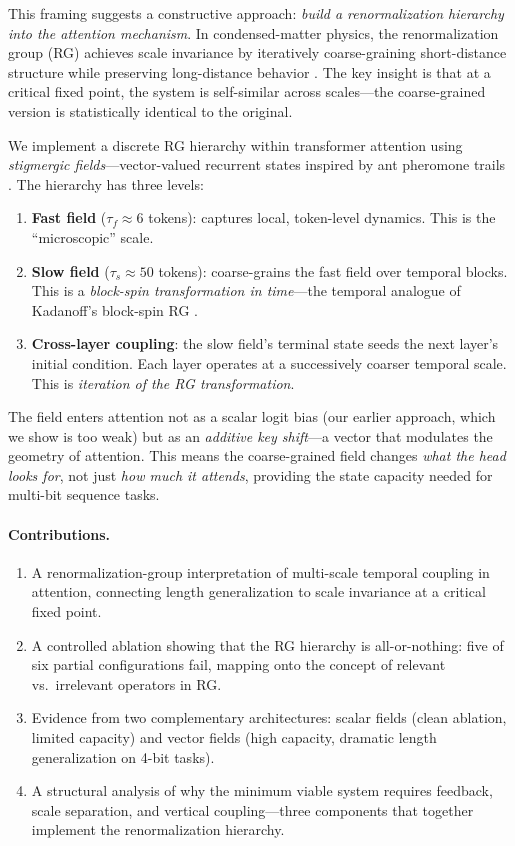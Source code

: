 \documentclass[11pt,a4paper]{article}
\begin{document}
This framing suggests a constructive approach: \emph{build a
renormalization hierarchy into the attention mechanism}.  In
condensed-matter physics, the renormalization group (RG) achieves
scale invariance by iteratively coarse-graining short-distance
structure while preserving long-distance behavior
\citep{kadanoff1966,wilson1971rg}.  The key insight is that at a
critical fixed point, the system is self-similar across scales---the
coarse-grained version is statistically identical to the original.

We implement a discrete RG hierarchy within transformer attention
using \emph{stigmergic fields}---vector-valued recurrent states
inspired by ant pheromone trails \citep{antpaper}.  The hierarchy has
three levels:

\begin{enumerate}
  \item \textbf{Fast field} ($\tau_f \approx 6$ tokens): captures
    local, token-level dynamics.  This is the ``microscopic'' scale.
  \item \textbf{Slow field} ($\tau_s \approx 50$ tokens):
    coarse-grains the fast field over temporal blocks.  This is a
    \emph{block-spin transformation in time}---the temporal analogue
    of Kadanoff's block-spin RG \citep{kadanoff1966}.
  \item \textbf{Cross-layer coupling}: the slow field's terminal
    state seeds the next layer's initial condition.  Each layer
    operates at a successively coarser temporal scale.  This is
    \emph{iteration of the RG transformation}.
\end{enumerate}

The field enters attention not as a scalar logit bias (our earlier
approach, which we show is too weak) but as an \emph{additive key
shift}---a vector that modulates the geometry of attention.  This
means the coarse-grained field changes \emph{what the head looks for},
not just \emph{how much it attends}, providing the state capacity
needed for multi-bit sequence tasks.

\paragraph{Contributions.}
\begin{enumerate}
  \item A renormalization-group interpretation of multi-scale temporal
    coupling in attention, connecting length generalization to scale
    invariance at a critical fixed point.
  \item A controlled ablation showing that the RG hierarchy is
    all-or-nothing: five of six partial configurations fail, mapping
    onto the concept of relevant vs.\ irrelevant operators in RG.
  \item Evidence from two complementary architectures: scalar fields
    (clean ablation, limited capacity) and vector fields (high
    capacity, dramatic length generalization on 4-bit tasks).
  \item A structural analysis of why the minimum viable system requires
    feedback, scale separation, and vertical coupling---three
    components that together implement the renormalization hierarchy.
\end{enumerate}
\end{document}

